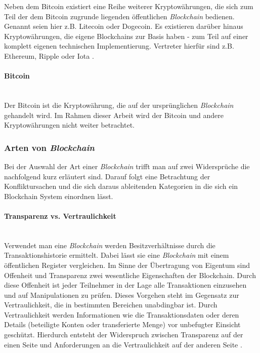 Neben dem Bitcoin existiert eine Reihe weiterer Kryptowährungen, die sich zum Teil der dem Bitcoin zugrunde liegenden öffentlichen \textit{Blockchain} bedienen. Genannt seien hier z.B. Litecoin oder Dogecoin. Es existieren darüber hinaus Kryptowährungen, die eigene Blockchains zur Basis haben - zum Teil auf einer komplett eigenen technischen Implementierung. Vertreter hierfür sind z.B. Ethereum, Ripple oder Iota \citep[siehe auch][]{Buterin2014, carVertical, JPMorgan2018}.

\paragraph{Bitcoin}$~~$\\
Der Bitcoin ist die Kryptowährung, die auf der ursprünglichen \textit{Blockchain} gehandelt wird. Im Rahmen dieser Arbeit wird der Bitcoin und andere Kryptowährungen nicht weiter betrachtet.

\subsubsection{Arten von \textit{Blockchain}} \label{Arten-von-Blockchain}
Bei der Auswahl der Art einer \textit{Blockchain} trifft man auf zwei Widersprüche die nachfolgend kurz erläutert sind. Darauf folgt eine Betrachtung der Konfliktursachen und die sich daraus ableitenden Kategorien in die sich ein Blockchain System einordnen lässt.

\paragraph{Transparenz vs. Vertraulichkeit}$~~$\\
Verwendet man eine \textit{Blockchain} werden Besitzverhältnisse durch die Transaktionshistorie ermittelt. Dabei lässt sie eine \textit{Blockchain} mit einem öffentlichen Register vergleichen. Im Sinne der Übertragung von Eigentum sind Offenheit und Transparenz zwei wesentliche Eigenschaften der Blockchain. Durch diese Offenheit ist jeder Teilnehmer in der Lage alle Transaktionen einzusehen und auf Manipulationen zu prüfen. Dieses Vorgehen steht im Gegensatz zur Vertraulichkeit, die in bestimmten Bereichen unabdingbar ist. Durch Vertraulichkeit werden Informationen wie die Transaktionsdaten oder deren Details (beteiligte Konten oder transferierte Menge) vor unbefugter Einsicht geschützt. Hierdurch entsteht der Widerspruch zwischen Transparenz auf der einen Seite und Anforderungen an die Vertraulichkeit auf der anderen Seite \citep{Drescher2017}.

